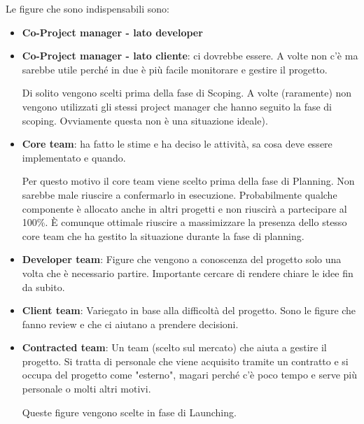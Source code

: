 Le figure che sono indispensabili sono:
\begin{itemize}
	\item \textbf{Co-Project manager - lato developer}
	\item \textbf{Co-Project manager - lato cliente}: ci dovrebbe essere. A volte non c'è ma sarebbe utile perché in due è più facile monitorare e gestire il progetto.
	\begin{info}
		Di solito vengono scelti prima della fase di Scoping. A volte (raramente) non vengono utilizzati gli stessi project manager che hanno seguito la fase di scoping. Ovviamente questa non è una situazione ideale).
	\end{info}
	\item \textbf{Core team}: ha fatto le stime e ha deciso le attività, sa cosa deve essere implementato e quando.
	\begin{info}
		Per questo motivo il core team viene scelto prima della fase di Planning. Non sarebbe male riuscire a confermarlo in esecuzione. Probabilmente qualche componente è allocato anche in altri progetti e non riuscirà a partecipare al 100\%. È comunque ottimale riuscire a massimizzare la presenza dello stesso core team che ha gestito la situazione durante la fase di planning.
	\end{info}
	\item \textbf{Developer team}: Figure che vengono a conoscenza del progetto solo una volta che è necessario partire. Importante cercare di rendere chiare le idee fin da subito.
	\item \textbf{Client team}: Variegato in base alla difficoltà del progetto. Sono le figure che fanno review e che ci aiutano a prendere decisioni.
	\item \textbf{Contracted team}: Un team (scelto sul mercato) che aiuta a gestire il progetto. Si tratta di personale che viene acquisito tramite un contratto e si occupa del progetto come "esterno", magari perché c'è poco tempo e serve più personale o molti altri motivi.
	\begin{info}
		Queste figure vengono scelte in fase di Launching.
	\end{info}
\end{itemize}

